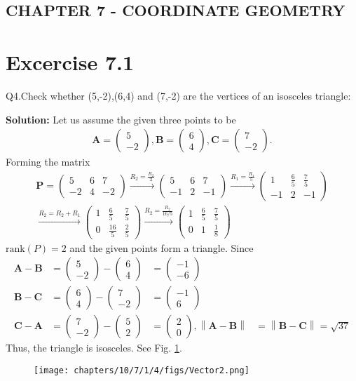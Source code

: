 \documentclass[12pt]{article}
\providecommand{\norm}[1]{\left\lVert#1\right\rVert}
\newcommand{\solution}{\noindent \textbf{Solution: }}
\newcommand{\myvec}[1]{\ensuremath{\begin{pmatrix}#1\end{pmatrix}}}
\let\vec\mathbf
\begin{document}
\begin{center}
\section*{CHAPTER 7 - COORDINATE GEOMETRY}

\end{center}
\section*{Excercise 7.1}

Q4.Check whether (5,-2),(6,4) and (7,-2) are the vertices of an isosceles triangle:

\solution
\fi
Let us assume the given three points to be
	\begin{align}
		\vec{A} = \myvec{5 \\-2},\vec{B}= \myvec{6\\4}, \vec{C} = \myvec{7\\-2}.
	\end{align}
Forming the matrix
	\begin{align}
\vec{P} = \myvec{
5&6&7\\
-2&4&-2
}\xrightarrow[]{R_2=\frac{R_2}{2}}
\myvec{
5&6&7\\
-1&2&-1
}\xrightarrow[]{R_1=\frac{R_1}{5}}
\myvec{
1&\frac{6}{5}&\frac{7}{5}\\
-1&2&-1
}\\\xrightarrow[]{R_2=R_2+R_1}
\myvec{
1&\frac{6}{5}&\frac{7}{5}\\
0&\frac{16}{5}&\frac{2}{5}
}\xrightarrow[]{R_2=\frac{R_2}{16/5}}
\myvec{
1&\frac{6}{5}&\frac{7}{5}\\
0&1&\frac{1}{8}
}
	\end{align}
$\text{rank}(P) = 2$ and the given points form a triangle. Since
	\begin{align}
		\vec{A}-\vec{B} &= \myvec{5\\-2} - \myvec{6\\4} &= \myvec{-1\\-6} \\
		\vec{B}-\vec{C} &= \myvec{6\\4} - \myvec{7\\-2} &= \myvec{-1\\6} \\
		\vec{C}-\vec{A} &= \myvec{7\\-2} - \myvec{5\\2} &= \myvec{2\\0},
		\norm{\vec{A}-\vec{B}} &=
\norm{\vec{B}-\vec{C}}  = \sqrt{37} 
	\end{align}
	Thus, the triangle is isosceles.  See Fig. 
\ref{fig:chapters/10/7/1/4/Fig}.
\begin{figure}[H]
	\begin{center} 
	    \texttt{[image: chapters/10/7/1/4/figs/Vector2.png]}
	\end{center}
\caption{}
\label{fig:chapters/10/7/1/4/Fig}
\end{figure}
\end{document}
